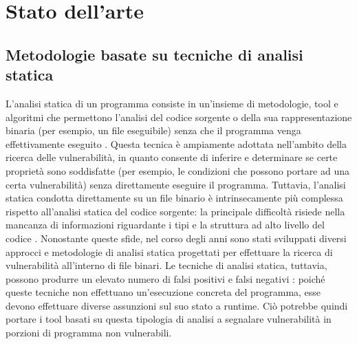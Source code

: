 \documentclass[../main.tex]{subfiles}
\begin{document}
\chapter{Stato dell'arte}
\label{chap:related}
\section{Metodologie basate su tecniche di analisi statica}
L'analisi statica di un programma consiste in un'insieme di metodologie, tool e algoritmi che permettono l'analisi del codice sorgente o della
sua rappresentazione binaria (per esempio, un file eseguibile) senza che il programma venga effettivamente eseguito \cite{static_analysis_introduction}.
Questa tecnica è ampiamente adottata nell'ambito della ricerca delle vulnerabilità, in quanto consente di inferire e determinare se
certe proprietà sono soddisfatte (per esempio, le condizioni che possono portare ad una certa vulnerabilità) senza direttamente eseguire il programma.
Tuttavia, l'analisi statica condotta direttamente su un file binario è intrinsecamente più complessa rispetto all'analisi statica del codice sorgente:
la principale difficoltà risiede nella mancanza di informazioni riguardante i tipi e la struttura ad alto livello del codice \cite{Review_of_static_analysis}.
Nonostante queste sfide, nel corso degli anni sono stati sviluppati diversi approcci e metodologie di analisi statica progettati per effettuare la ricerca di vulnerabilità all'interno di file binari.
Le tecniche di analisi statica, tuttavia, possono produrre un elevato numero di falsi positivi e falsi negativi : poiché queste tecniche non effettuano un'esecuzione concreta del programma,
esse devono effettuare diverse assunzioni sul suo stato a runtime. Ciò potrebbe quindi portare i tool basati su questa tipologia di analisi a segnalare vulnerabilità in porzioni di programma non vulnerabili.
\end{document}
